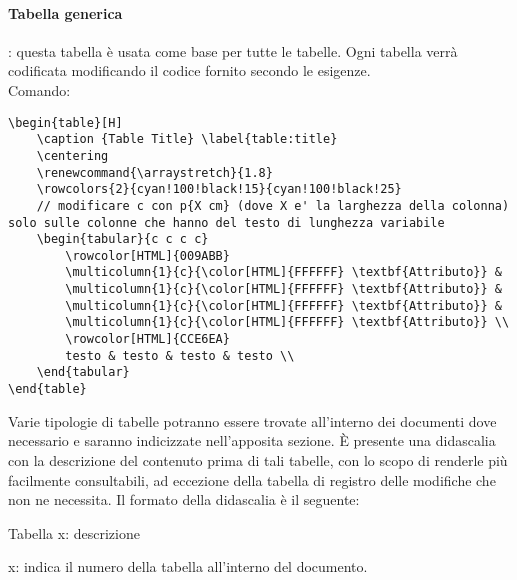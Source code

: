 \paragraph{Tabella generica}: questa tabella è usata come base per tutte le tabelle. Ogni tabella verrà codificata modificando il codice fornito secondo le esigenze.\\
Comando:
\begin{lstlisting}
\begin{table}[H]
	\caption {Table Title} \label{table:title}
	\centering
	\renewcommand{\arraystretch}{1.8}
	\rowcolors{2}{cyan!100!black!15}{cyan!100!black!25}
	// modificare c con p{X cm} (dove X e' la larghezza della colonna) solo sulle colonne che hanno del testo di lunghezza variabile
	\begin{tabular}{c c c c}
		\rowcolor[HTML]{009ABB} 
		\multicolumn{1}{c}{\color[HTML]{FFFFFF} \textbf{Attributo}} &
		\multicolumn{1}{c}{\color[HTML]{FFFFFF} \textbf{Attributo}} &
		\multicolumn{1}{c}{\color[HTML]{FFFFFF} \textbf{Attributo}} &
		\multicolumn{1}{c}{\color[HTML]{FFFFFF} \textbf{Attributo}} \\
		\rowcolor[HTML]{CCE6EA}
		testo & testo & testo & testo \\
	\end{tabular}
\end{table}
\end{lstlisting}	
Varie tipologie di tabelle potranno essere trovate all'interno dei documenti dove necessario e saranno indicizzate nell'apposita sezione. È presente una didascalia con la descrizione del contenuto prima di tali tabelle, con lo scopo di renderle più facilmente consultabili, ad eccezione della tabella di registro delle modifiche che non ne necessita. Il formato della didascalia è il seguente:\\
\begin{center}
	Tabella x: descrizione
\end{center}
x: indica il numero della tabella all'interno del documento.

